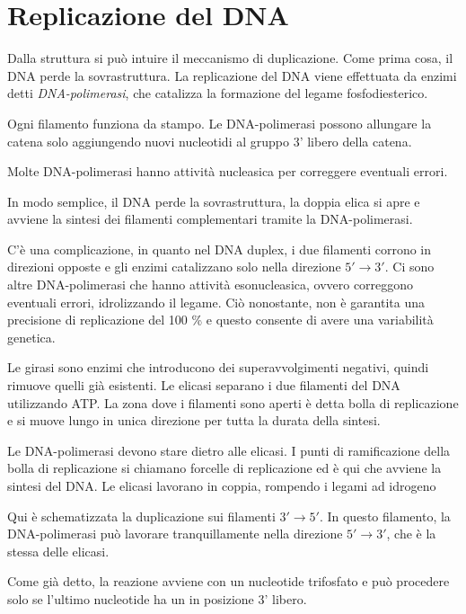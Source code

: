 \chapter{Replicazione del DNA}


Dalla struttura si può intuire il meccanismo di duplicazione. Come prima cosa, il DNA perde la sovrastruttura. La replicazione del DNA viene effettuata da enzimi detti \emph{DNA-polimerasi}, che catalizza la formazione del legame fosfodiesterico.

Ogni filamento funziona da stampo. Le DNA-polimerasi possono allungare la catena solo aggiungendo nuovi nucleotidi al gruppo  3' libero della catena.

Molte DNA-polimerasi hanno attività nucleasica per correggere eventuali errori.

In modo semplice, il DNA perde la sovrastruttura, la doppia elica si apre e avviene la sintesi dei filamenti complementari tramite la DNA-polimerasi.

C'è una complicazione, in quanto nel DNA duplex, i due filamenti corrono in direzioni opposte e gli enzimi catalizzano solo nella direzione $5' \to 3'$. Ci sono altre DNA-polimerasi che hanno attività esonucleasica, ovvero correggono eventuali errori, idrolizzando il legame. Ciò nonostante, non è garantita una precisione di replicazione del 100 \% e questo consente di avere una variabilità genetica.

Le girasi sono enzimi che introducono dei superavvolgimenti negativi, quindi rimuove quelli già esistenti. Le elicasi separano i due filamenti del DNA utilizzando ATP.
La zona dove i filamenti sono aperti è detta bolla di replicazione e si muove lungo in unica direzione per tutta la durata della sintesi.

Le DNA-polimerasi devono stare dietro alle elicasi. I punti di ramificazione della bolla di replicazione si chiamano forcelle di replicazione ed è qui che avviene la sintesi del DNA. Le elicasi lavorano in coppia, rompendo i legami ad idrogeno


Qui è schematizzata la duplicazione sui filamenti $3' \to 5'$. In questo filamento, la DNA-polimerasi può lavorare tranquillamente nella direzione $5' \to 3'$, che è la stessa delle elicasi.


Come già detto, la reazione avviene con un nucleotide trifosfato e può procedere solo se l'ultimo nucleotide ha un  in posizione 3' libero.

